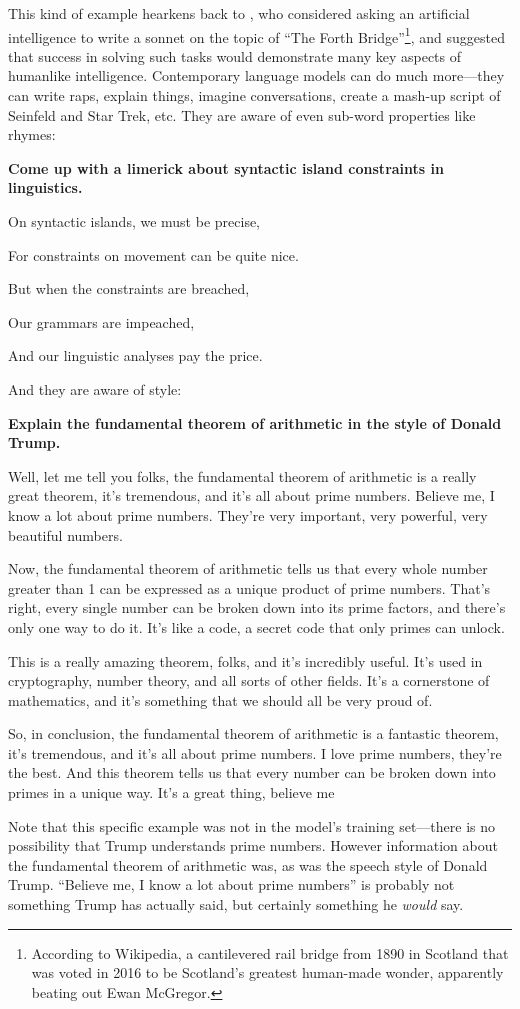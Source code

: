 \documentclass[output=paper,colorlinks,citecolor=brown
]{langscibook}
\begin{document}
This kind of example hearkens back to \cite{turing1950computing}, who considered asking an artificial intelligence to write a sonnet on the topic of ``The Forth Bridge''\footnote{ According to Wikipedia, a cantilevered rail bridge from 1890 in Scotland that was voted in 2016 to be Scotland's greatest human-made wonder, apparently beating out Ewan McGregor.}, and suggested that success in solving such tasks would demonstrate many key aspects of humanlike intelligence. Contemporary language models can do much more---they can write raps, explain things, imagine conversations, create a mash-up script of Seinfeld and Star Trek, etc. They are aware of even sub-word properties like rhymes:
\begin{myquote}
\textbf{Come up with a limerick about syntactic island constraints in linguistics.}

On syntactic islands, we must be precise,

For constraints on movement can be quite nice.

But when the constraints are breached,

Our grammars are impeached,

And our linguistic analyses pay the price.
\end{myquote}
\noindent And they are aware of style:
\begin{myquote}
\textbf{Explain the fundamental theorem of arithmetic in the style of Donald Trump.}

Well, let me tell you folks, the fundamental theorem of arithmetic is a really great theorem, it's tremendous, and it's all about prime numbers. Believe me, I know a lot about prime numbers. They're very important, very powerful, very beautiful numbers.

Now, the fundamental theorem of arithmetic tells us that every whole number greater than 1 can be expressed as a unique product of prime numbers. That's right, every single number can be broken down into its prime factors, and there's only one way to do it. It's like a code, a secret code that only primes can unlock.

This is a really amazing theorem, folks, and it's incredibly useful. It's used in cryptography, number theory, and all sorts of other fields. It's a cornerstone of mathematics, and it's something that we should all be very proud of.

So, in conclusion, the fundamental theorem of arithmetic is a fantastic theorem, it's tremendous, and it's all about prime numbers. I love prime numbers, they're the best. And this theorem tells us that every number can be broken down into primes in a unique way. It's a great thing, believe me
\end{myquote}
\noindent Note that this specific example was not in the model's training set---there is no possibility that Trump understands prime numbers. However information about the fundamental theorem of arithmetic was, as was the speech style of Donald Trump. ``Believe me, I know a lot about prime numbers'' is probably not something Trump has actually said, but certainly something he \emph{would} say. 
\end{document}
